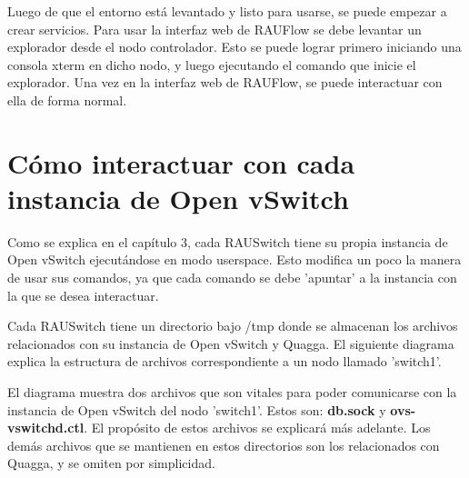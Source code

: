 Luego de que el entorno está levantado y listo para usarse, se puede empezar a crear servicios. Para usar la interfaz web de RAUFlow se debe levantar un explorador desde el nodo controlador. Esto se puede lograr primero iniciando una consola xterm en dicho nodo, y luego ejecutando el comando que inicie el explorador. Una vez en la interfaz web de RAUFlow, se puede interactuar con ella de forma normal.

\section{Cómo interactuar con cada instancia de Open vSwitch}
Como se explica en el capítulo 3, cada RAUSwitch tiene su propia instancia de Open vSwitch ejecutándose en modo userspace. Esto modifica un poco la manera de usar sus comandos, ya que cada comando se debe 'apuntar' a la instancia con la que se desea interactuar.

Cada RAUSwitch tiene un directorio bajo /tmp donde se almacenan los archivos relacionados con su instancia de Open vSwitch y Quagga. El siguiente diagrama explica la estructura de archivos correspondiente a un nodo llamado 'switch1'. 

El diagrama muestra dos archivos que son vitales para poder comunicarse con la instancia de Open vSwitch del nodo 'switch1'. Estos son: \textbf{db.sock} y \textbf{ovs-vswitchd.ctl}. El propósito de estos archivos se explicará más adelante. Los demás archivos que se mantienen en estos directorios son los relacionados con Quagga, y se omiten por simplicidad.

